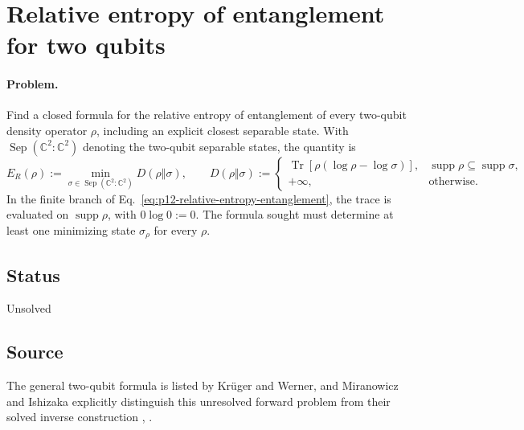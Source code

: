 \section{Relative entropy of entanglement for two qubits}
\label{sec:op_e2149f4ced34d1a8}

\paragraph{Problem.}
Find a closed formula for the relative entropy of entanglement of every
two-qubit density operator $\rho$, including an explicit closest separable
state.  With $\operatorname{Sep}(\mathbb{C}^2:\mathbb{C}^2)$ denoting the
two-qubit separable states, the quantity is
\begin{equation}
  E_R(\rho)
  :=\min_{\sigma\in\operatorname{Sep}(\mathbb{C}^2:\mathbb{C}^2)}
       D(\rho\Vert\sigma),
  \qquad
  D(\rho\Vert\sigma)
  :=\begin{cases}
    \operatorname{Tr}\!\left[\rho(\log\rho-\log\sigma)\right],
      &\operatorname{supp}\rho\subseteq\operatorname{supp}\sigma,\\
    +\infty,&\text{otherwise}.
  \end{cases}
  \label{eq:p12-relative-entropy-entanglement}
\end{equation}
In the finite branch of Eq.~\eqref{eq:p12-relative-entropy-entanglement}, the
trace is evaluated on $\operatorname{supp}\rho$, with $0\log 0:=0$.  The
formula sought must determine at least one minimizing state $\sigma_\rho$ for
every $\rho$.

\subsection*{Status}

Unsolved

\subsection*{Source}

The general two-qubit formula is listed by Kr\"uger and Werner, and
Miranowicz and Ishizaka explicitly distinguish this unresolved forward
problem from their solved inverse construction
,
.

